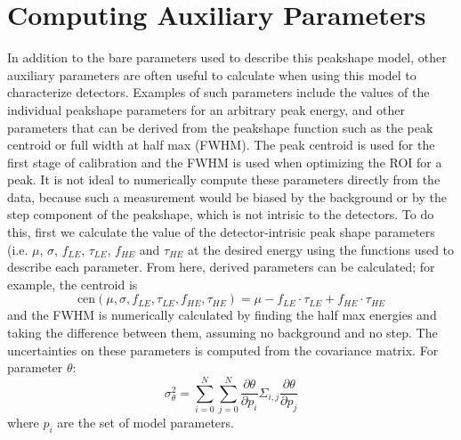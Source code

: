 \documentclass[/main.tex]{subfiles}
\begin{document}
\section{Computing Auxiliary Parameters}
In addition to the bare parameters used to describe this peakshape model, other auxiliary parameters are often useful to calculate when using this model to characterize detectors.
Examples of such parameters include the values of the individual peakshape parameters for an arbitrary peak energy, and other parameters that can be derived from the peakshape function such as the peak centroid or full width at half max (FWHM).
The peak centroid is used for the first stage of calibration and the FWHM is used when optimizing the ROI for a peak.
It is not ideal to numerically compute these parameters directly from the data, because such a measurement would be biased by the background or by the step component of the peakshape, which is not intrisic to the detectors.
To do this, first we calculate the value of the detector-intrisic peak shape parameters (i.e. $\mu$, $\sigma$, $f_{LE}$, $\tau_{LE}$, $f_{HE}$ and $\tau_{HE}$ at the desired energy using the functions used to describe each parameter.
From here, derived parameters can be calculated; for example, the centroid is
\begin{equation}
  \mathrm{cen}(\mu, \sigma, f_{LE}, \tau_{LE}, f_{HE}, \tau_{HE})=\mu - f_{LE}\cdot\tau_{LE} + f_{HE}\cdot\tau_{HE}
\end{equation}
and the FWHM is numerically calculated by finding the half max energies and taking the difference between them, assuming no background and no step.
The uncertainties on these parameters is computed from the covariance matrix.
For parameter $\theta$:
\begin{equation}
  \sigma_\theta^2= \sum_{i=0}^{N}\sum_{j=0}^{N} \frac{\partial\theta}{\partial p_i} \Sigma_{i,j} \frac{\partial\theta}{\partial p_j}
\end{equation}
where $p_i$ are the set of model parameters.
\\
\end{document}
